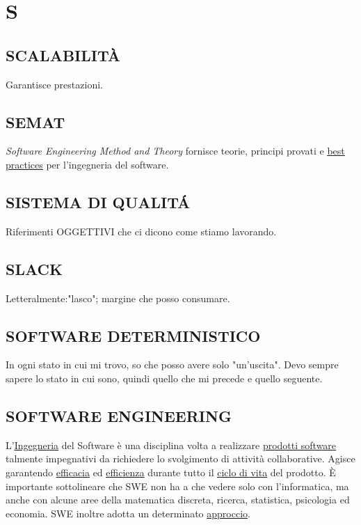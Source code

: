 \newpage
	\flushright{\hyperref[index]{\color{black!65}{Ritorna all'indice}}}\flushleft
	\section{S} \label{sec:S}
	
		\subsection{SCALABILITÀ}  \label{scalabitlita}
		Garantisce prestazioni.
		
		\subsection{SEMAT}  \label{semat}
			\textit{Software Engineering Method and Theory} fornisce teorie, principi provati e \underline{\hyperref[best]{best practices}} per l'ingegneria del software.
		
		\subsection{SISTEMA DI QUALITÁ}  \label{sistemadiqualita}
		Riferimenti OGGETTIVI che ci dicono come stiamo lavorando.
		
		\subsection{SLACK}  \label{slack}
		Letteralmente:"lasco"; margine che posso consumare.
		
		\subsection{SOFTWARE DETERMINISTICO}  \label{softwaredeterministico} 
		In ogni stato in cui mi trovo, so che posso avere solo "un'uscita". Devo sempre sapere lo stato in cui sono, quindi quello che mi precede e quello seguente.
		
		
		\subsection{SOFTWARE ENGINEERING}  \label{swe}
	     L'\underline{\hyperref[engineering]{Ingegneria}} del Software è una disciplina volta a realizzare  \underline{\hyperref[prodotto]{prodotti software}} talmente impegnativi da richiedere lo svolgimento di attività collaborative. Agisce garantendo \underline{\hyperref[efficacia]{efficacia}} ed \underline{\hyperref[efficienza]{efficienza}} durante tutto il \underline{\hyperref[ciclo]{ciclo di vita}} del prodotto. È importante sottolineare che SWE non ha a che vedere solo con l'informatica, ma anche con alcune aree della matematica discreta, ricerca, statistica, psicologia ed economia. SWE inoltre adotta un determinato \underline{\hyperref[approccio]{approccio}}.
		
